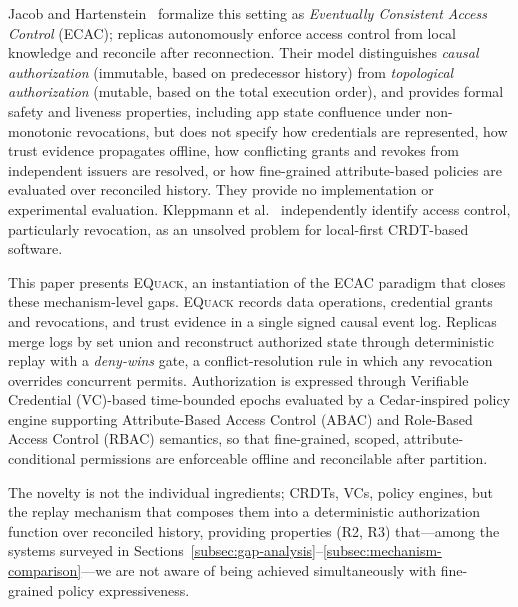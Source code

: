 \documentclass[10pt,journal,compsoc]{IEEEtran}
\newcommand{\equack}{\textsc{EQuack}}
\begin{document}
  Jacob and Hartenstein~\cite{jacob2024eventuallyac} formalize
  this setting as \emph{Eventually Consistent Access Control}
  (ECAC); replicas autonomously enforce access control from local
  knowledge and reconcile after reconnection. Their model distinguishes
  \emph{causal authorization} (immutable, based on predecessor history) from
  \emph{topological authorization} (mutable, based on the total execution order),
  and provides formal safety and liveness properties, including app state
  confluence under non-monotonic revocations, but does not specify
  how credentials are represented, how trust evidence propagates
  offline, how conflicting grants and revokes from independent
  issuers are resolved, or how fine-grained attribute-based
  policies are evaluated over reconciled history. They provide no
  implementation or experimental evaluation.
  Kleppmann et al.~\cite{kleppmann2019localfirst} independently
  identify access control, particularly revocation, as an
  unsolved problem for local-first CRDT-based software.

  This paper presents \equack{}, an instantiation of the
  ECAC paradigm that closes these mechanism-level gaps. \equack{}
  records data operations, credential grants and revocations, and
  trust evidence in a single signed causal event log. Replicas
  merge logs by set union and reconstruct authorized state through
  deterministic replay with a \emph{deny-wins} gate, a conflict-resolution rule in which any revocation overrides concurrent permits. Authorization is
  expressed through Verifiable Credential (VC)-based time-bounded epochs evaluated by a
  Cedar-inspired policy engine supporting Attribute-Based Access Control (ABAC) and Role-Based Access Control (RBAC) semantics,
  so that fine-grained, scoped, attribute-conditional permissions
  are enforceable offline and reconcilable after partition.

  The novelty is not the individual ingredients; CRDTs, VCs,
  policy engines, but the replay mechanism that composes them into
  a deterministic authorization function over reconciled history,
  providing properties (R2, R3) that---among the systems surveyed
  in Sections~\ref{subsec:gap-analysis}--\ref{subsec:mechanism-comparison}---we
  are not aware of being achieved simultaneously with fine-grained
  policy expressiveness.
\end{document}
